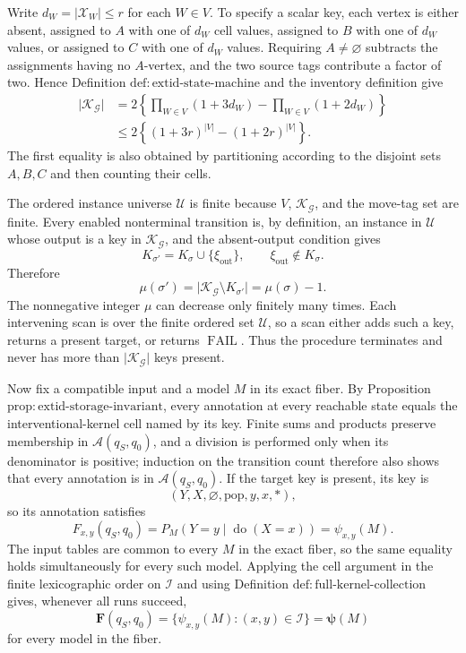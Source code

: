 Write \(d_W=\lvert\mathcal X_W\rvert\leq r\) for each \(W\in V\).  To specify a scalar key, each vertex is either absent, assigned to \(A\) with one of \(d_W\) cell values, assigned to \(B\) with one of \(d_W\) values, or assigned to \(C\) with one of \(d_W\) values.  Requiring \(A\neq\varnothing\) subtracts the assignments having no \(A\)-vertex, and the two source tags contribute a factor of two.  Hence Definition \(\mathrm{def{:}extid\text{-}state\text{-}machine}\) and the inventory definition give
\[
 \begin{aligned}
 \lvert\mathscr K_{\mathcal G}\rvert
 &=2\left\{\prod_{W\in V}(1+3d_W)-\prod_{W\in V}(1+2d_W)\right\}\\
 &\leq2\left\{(1+3r)^{\lvert V\rvert}-(1+2r)^{\lvert V\rvert}\right\}.
 \end{aligned}
\]
The first equality is also obtained by partitioning according to the disjoint sets \(A,B,C\) and then counting their cells.

The ordered instance universe \(\mathscr U\) is finite because \(V\), \(\mathscr K_{\mathcal G}\), and the move-tag set are finite.  Every enabled nonterminal transition is, by definition, an instance in \(\mathscr U\) whose output is a key in \(\mathscr K_{\mathcal G}\), and the absent-output condition gives
\[
 K_{\sigma'}=K_\sigma\cup\{\xi_{\mathrm{out}}\},
 \qquad \xi_{\mathrm{out}}\notin K_\sigma.
\]
Therefore
\[
 \mu(\sigma')
 =\lvert\mathscr K_{\mathcal G}\setminus K_{\sigma'}\rvert
 =\mu(\sigma)-1.
\]
The nonnegative integer \(\mu\) can decrease only finitely many times.  Each intervening scan is over the finite ordered set \(\mathscr U\), so a scan either adds such a key, returns a present target, or returns \(\operatorname{FAIL}\).  Thus the procedure terminates and never has more than \(\lvert\mathscr K_{\mathcal G}\rvert\) keys present.

Now fix a compatible input and a model \(M\) in its exact fiber.  By Proposition \(\mathrm{prop{:}extid\text{-}storage\text{-}invariant}\), every annotation at every reachable state equals the interventional-kernel cell named by its key.  Finite sums and products preserve membership in \(\mathcal A(q_S,q_0)\), and a division is performed only when its denominator is positive; induction on the transition count therefore also shows that every annotation is in \(\mathcal A(q_S,q_0)\).  If the target key is present, its key is
\[
 (Y,X,\varnothing,\mathrm{pop},y,x,\ast),
\]
so its annotation satisfies
\[
 F_{x,y}(q_S,q_0)
 =P_M(Y=y\mid\operatorname{do}(X=x))
 =\psi_{x,y}(M).
\]
The input tables are common to every \(M\) in the exact fiber, so the same equality holds simultaneously for every such model.  Applying the cell argument in the finite lexicographic order on \(\mathcal I\) and using Definition \(\mathrm{def{:}full\text{-}kernel\text{-}collection}\) gives, whenever all runs succeed,
\[
 \mathbf F(q_S,q_0)=\{\psi_{x,y}(M):(x,y)\in\mathcal I\}
 =\boldsymbol\psi(M)
\]
for every model in the fiber.